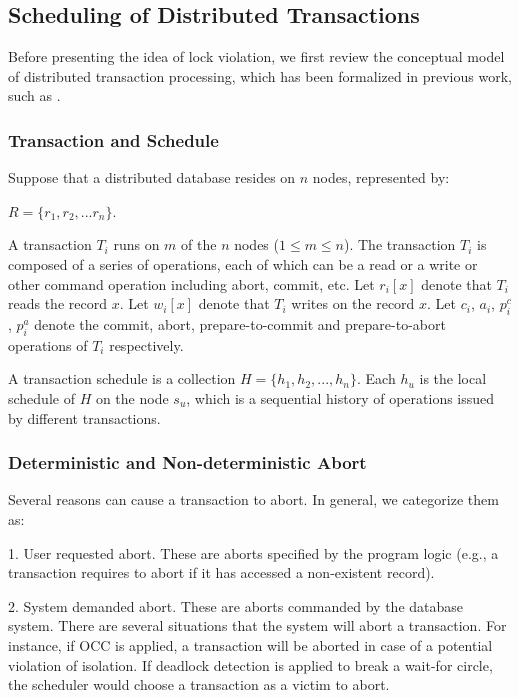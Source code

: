\documentclass[conference]{IEEEtran}
\begin{document}
\subsection{Scheduling of Distributed Transactions}
Before presenting the idea of lock violation, we first review the conceptual model of distributed transaction processing,
which has been formalized in previous work, such as \cite{LockNoWait:journals/csur/BernsteinG81}.

\subsubsection{Transaction and Schedule}
Suppose that a distributed database resides on ${n}$ nodes, represented by: 

  ${R = \{r_1, r_2, ... r_n\}}$.

A transaction ${T_i}$ runs on ${m}$ of the ${n}$ nodes ($1 \le m \le n$).%
The transaction ${T_i}$ is composed of a series of operations,
each of which can be a read or a write or other command operation including abort, commit, etc.
Let ${r_i[x]}$ denote that ${T_i}$ reads the record ${x}$. Let ${w_i[x]}$ denote that ${T_i}$ writes on the record ${x}$.
Let ${c_i}$, ${a_i}$, ${p^c_i}$, ${p^a_i}$ denote the commit, abort, prepare-to-commit and prepare-to-abort operations of ${T_i}$ respectively.


A transaction schedule is a collection ${H = \{h_1, h_2, ..., h_n\}}$.
Each ${h_u}$ is the local schedule of $H$ on the node ${s_u}$, which is a sequential history of operations issued by different transactions.

\subsubsection{Deterministic and Non-deterministic Abort}

Several reasons can cause a transaction to abort. In general, we categorize them as:

1. User requested abort.
These are aborts specified by the program logic (e.g., a transaction requires to abort if it has accessed a non-existent record).

2. System demanded abort.
These are aborts commanded by the database system.
There are several situations that the system will abort a transaction.
For instance, if OCC is applied, a transaction will be aborted in case of a potential violation of isolation.
If deadlock detection is applied to break a wait-for circle,
the scheduler would choose a transaction as a victim to abort.
\end{document}

